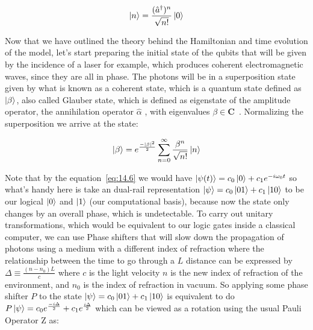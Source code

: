 \documentclass[
  journal=largetwo,
  year=2023,
]{cup-journal}
\begin{document}
\begin{equation}
  \begin{aligned}\label{eq:14.7}
    \ket{n} = \frac{(\hat{a}^{\dag})^n}{\sqrt{n!}}\ket{0}
  \end{aligned}
\end{equation}


Now that we have outlined the theory behind the Hamiltonian and time evolution of the model, let's start preparing the initial state of the qubits that will be given by the incidence of a laser for example, which produces coherent electromagnetic waves, since they are all in phase. The photons will be in a superposition state given by what is known as a coherent state, which is a quantum state defined as \(\ket{\beta}\), also called Glauber state, which is defined as eigenstate of the amplitude operator, the annihilation operator \(\hat{\alpha}\) , with eigenvalues \(\beta \in \textbf{C}\)~\autocite{bertlmann_2008_theoretical}.
Normalizing the superposition we arrive at the state:

\begin{equation}
  \begin{aligned}\label{eq:15}
    \ket{\beta} = e^{\frac{-|\beta|^2}{2}}\sum_{n=0}^{\infty}{\frac{\beta^n}{\sqrt{n!}}\ket{n}}
  \end{aligned}
\end{equation}


Note that by the equation~\ref{eq:14.6} we would have \(\ket{\psi(t)} = c_0\ket{0} + c_1e^{-i\omega_0t}\) so what's handy here is take an dual-rail representation \(\ket{\psi} = c_0\ket{01} + c_1\ket{10}\) to be our logical \(\ket{0}\) and \(\ket{1}\) (our computational basis), because now the state only changes by an overall phase, which is undetectable. To carry out unitary transformations, which would be equivalent to our logic gates inside a classical computer, we can use Phase shifters that will slow down the propagation of photons using a medium with a different index of refraction where the relationship between the time to go through a \(L\) distance can be expressed by \(\Delta \equiv \frac{(n - n_0)L}{c}\) where \(c\) is the light velocity \(n\) is the new index of refraction of the environment, and \(n_0\) is the index of refraction in vacuum. So applying some phase shifter \(P\) to the state \(\ket{\psi} = c_0\ket{01} + c_1\ket{10}\) is equivalent to do \(P\ket{\psi} = c_0e^{\frac{-i\Delta}{2}} + c_1e^{\frac{i\Delta}{2}}\) which can be viewed as a rotation using the usual Pauli Operator Z as:
\end{document}
